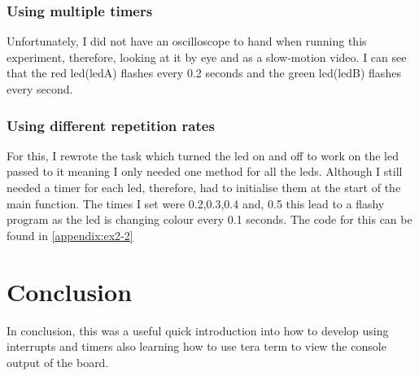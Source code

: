 \documentclass[a4paper,12pt]{scrartcl}
\begin{document}
{{			\subsubsection{Using multiple timers}
			{
				Unfortunately, I did not have an oscilloscope to hand when running this experiment, therefore, looking at it by eye and as a slow-motion video. I can see that the red led(ledA) flashes every 0.2 seconds and the green led(ledB) flashes every second. 
			}
			\subsubsection{Using different repetition rates}
			{
				For this, I rewrote the task which turned the led on and off to work on the led passed to it meaning I only needed one method for all the leds. Although I still needed a timer for each led, therefore, had to initialise them at the start of the main function. The times I set were 0.2,0.3,0.4 and, 0.5 this lead to a flashy program as the led is changing colour every 0.1 seconds. The code for this can be found in \cref{appendix:ex2-2}
			}
		}
	}

	\section{Conclusion}
	{
		In conclusion, this was a useful quick introduction into how to develop using interrupts and timers also learning how to use tera term to view the console output of the board.
	}
	
	\newpage
	
	\printbibliography[heading=bibintoc,title=References]
\end{document}
